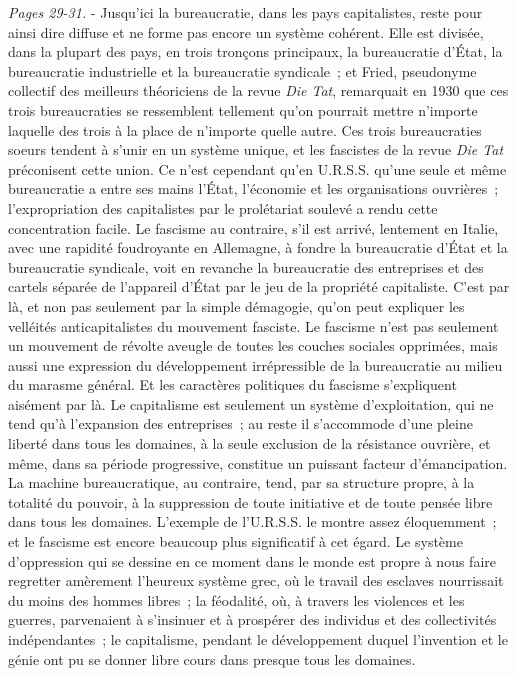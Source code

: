 \documentclass[french,twoside]{book} %
\begin{document}
{\itshape Pages 29-31.} - Jusqu'ici la bureaucratie, dans les pays capitalistes, reste pour ainsi dire diffuse et ne forme pas encore un système cohérent. Elle est divisée, dans la plupart des pays, en trois tronçons principaux, la bureaucratie d'État, la bureaucratie industrielle et la bureaucratie syndicale ; et Fried, pseudonyme collectif des meilleurs théoriciens de la revue {\itshape Die Tat}, remarquait en 1930 que ces trois bureaucraties se ressemblent tellement qu'on pourrait mettre n'importe laquelle des trois à la place de n'importe quelle autre. Ces trois bureaucraties soeurs tendent à s'unir en un système unique, et les fascistes de la revue {\itshape Die Tat} préconisent cette union. Ce n'est cependant qu'en U.R.S.S. qu'une seule et même bureaucratie a entre ses mains l'État, l'économie et les organisations ouvrières ; l'expropriation des capitalistes par le prolétariat soulevé a rendu cette concentration facile. Le fascisme au contraire, s'il est arrivé, lentement en Italie, avec une rapidité foudroyante en Allemagne, à fondre la bureaucratie d’État et la bureaucratie syndicale, voit en revanche la bureaucratie des entreprises et des cartels séparée de l'appareil d'État par le jeu de la propriété capitaliste. C'est par là, et non pas seulement par la simple démagogie, qu'on peut expliquer les velléités anticapitalistes du mouvement fasciste. Le fascisme n'est pas seulement un mouvement de révolte aveugle de toutes les couches sociales opprimées, mais aussi une expression du développement irrépressible de la bureaucratie au milieu du marasme général. Et les caractères politiques du fascisme s'expliquent aisément par là. Le capitalisme est seulement un système d'exploitation, qui ne tend qu'à l'expansion des entreprises ; au reste il s'accommode d'une pleine liberté dans tous les domaines, à la seule exclusion de la résistance ouvrière, et même, dans sa période progressive, constitue un puissant facteur d'émancipation. La machine bureaucratique, au contraire, tend, par sa structure propre, à la totalité du pouvoir, à la suppression de toute initiative et de toute pensée libre dans tous les domaines. L'exemple de l'U.R.S.S. le montre assez éloquemment ; et le fascisme est encore beaucoup plus significatif à cet égard. Le système d'oppression qui se dessine en ce moment dans le monde est propre à nous faire regretter amèrement l'heureux système grec, où le travail des esclaves nourrissait du moins des hommes libres ; la féodalité, où, à travers les violences et les guerres, parvenaient à s'insinuer et à prospérer des individus et des collectivités indépendantes ; le capitalisme, pendant le développement duquel l'invention et le génie ont pu se donner libre cours dans presque tous les domaines.
\end{document}
